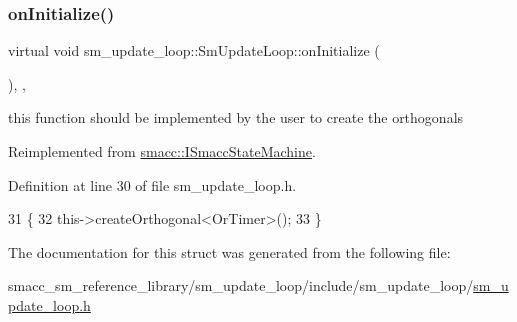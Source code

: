 \subsubsection{\texorpdfstring{on\+Initialize()}{onInitialize()}}
{\footnotesize\ttfamily virtual void sm\+\_\+update\+\_\+loop\+::\+Sm\+Update\+Loop\+::on\+Initialize (\begin{DoxyParamCaption}{ }\end{DoxyParamCaption})\hspace{0.3cm}{\ttfamily [inline]}, {\ttfamily [override]}, {\ttfamily [virtual]}}



this function should be implemented by the user to create the orthogonals 



Reimplemented from \hyperlink{classsmacc_1_1ISmaccStateMachine_ac2982c6c8283663e5e1e8a7c82f511ec}{smacc\+::\+I\+Smacc\+State\+Machine}.



Definition at line 30 of file sm\+\_\+update\+\_\+loop.\+h.


\begin{DoxyCode}
31     \{
32         this->createOrthogonal<OrTimer>();
33     \}
\end{DoxyCode}


The documentation for this struct was generated from the following file\+:\begin{DoxyCompactItemize}
\item 
smacc\+\_\+sm\+\_\+reference\+\_\+library/sm\+\_\+update\+\_\+loop/include/sm\+\_\+update\+\_\+loop/\hyperlink{sm__update__loop_8h}{sm\+\_\+update\+\_\+loop.\+h}\end{DoxyCompactItemize}
